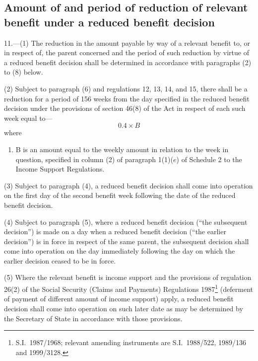 \documentclass[12pt,a4paper]{article}
\begin{document}

\subsection[11. Amount of and period of reduction of relevant benefit under a reduced benefit decision]{Amount of and period of reduction of relevant benefit under a reduced benefit decision}

11.---(1)  The reduction in the amount payable by way of a relevant benefit to, or in respect of, the parent concerned and the period of such reduction by virtue of a reduced benefit decision shall be determined in accordance with paragraphs (2) to (8) below.

(2) Subject to paragraph (6) and regulations 12, 13, 14, and 15, there shall be a reduction for a period of 156 weeks from the day specified in the reduced benefit decision under the provisions of section 46(8) of the Act in respect of each such week equal to—
\[
0.4 \times B
\]
where
\begin{enumerate}\item[]
    B is an amount equal to the weekly amount in relation to the week in question, specified in column (2) of paragraph 1(1)($e$)  of Schedule 2 to the Income Support Regulations. 
\end{enumerate}

(3) Subject to paragraph (4), a reduced benefit decision shall come into operation on the first day of the second benefit week following the date of the reduced benefit decision.

(4) Subject to paragraph (5), where a reduced benefit decision (“the subsequent decision”) is made on a day when a reduced benefit decision (“the earlier decision”) is in force in respect of the same parent, the subsequent decision shall come into operation on the day immediately following the day on which the earlier decision ceased to be in force.

(5) Where the relevant benefit is income support and the provisions of regulation 26(2) of the Social Security (Claims and Payments) Regulations 1987\footnote{S.I.\ 1987/1968; relevant amending instruments are S.I.\ 1988/522, 1989/136 and 1999/3128.} (deferment of payment of different amount of income support) apply, a reduced benefit decision shall come into operation on such later date as may be determined by the Secretary of State in accordance with those provisions.
\end{document}
